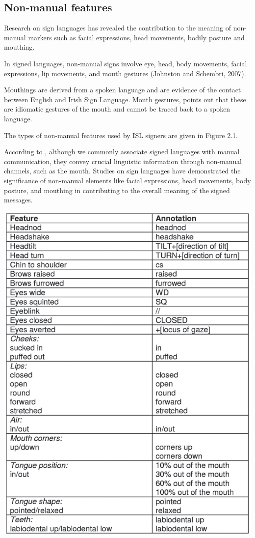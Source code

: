 \subsection{Non-manual features}

Research on sign languages has revealed the contribution to the meaning of non-manual markers such as facial expressions, head movements, bodily posture and mouthing. 

In signed languages, non-manual signs involve eye, head, body movements, facial expressions, lip movements, and mouth gestures (Johnston and Schembri, 2007).

Mouthings are derived from a spoken language and are evidence of the contact between English and Irish Sign Language. 
Mouth gestures, \textcite{sutton2007mouthings} points out that these are idiomatic gestures of the mouth and cannot be traced back to a spoken language. 

The types of non-manual features used by ISL signers are given in Figure 2.1.

According to \textcite{sutton2007mouthings}, although we commonly associate signed languages with manual communication, they convey crucial linguistic information through non-manual channels, such as the mouth. Studies on sign languages have demonstrated the significance of non-manual elements like facial expressions, head movements, body posture, and mouthing in contributing to the overall meaning of the signed messages.

\includegraphics[width=\textwidth]{figures/nm.png}


